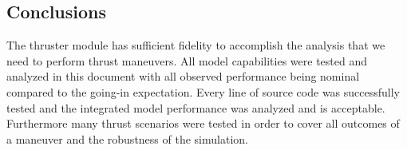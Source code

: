 \subsection{Conclusions}
The thruster module has sufficient fidelity to accomplish the analysis 
that we need to perform thrust maneuvers.  All model capabilities were 
tested and analyzed in this document with all observed performance being nominal 
compared to the going-in expectation. Every line of source code was successfully tested and the integrated model 
performance was analyzed and is acceptable. Furthermore many thrust scenarios were tested in order to cover all outcomes of a maneuver and the robustness of the simulation.



